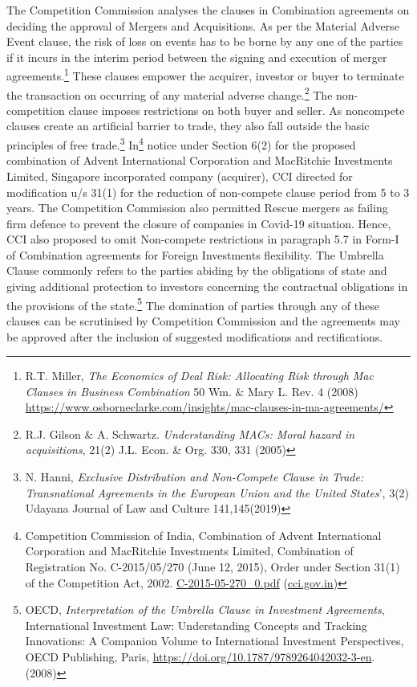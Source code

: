 \begin{multicols}{2}
\noi
The Competition Commission analyses the clauses in Combination agreements on deciding
the approval of Mergers and Acquisitions. As per the Material Adverse Event clause, the risk
of loss on events has to be borne by any one of the parties if it incurs in the interim period
between the signing and execution of merger agreements.\footnote{R.T. Miller, \textit{The Economics of Deal Risk: Allocating Risk through Mac Clauses in Business Combination}
50 Wm. \& Mary L. Rev. 4 (2008) \url{https://www.osborneclarke.com/insights/mac-clauses-in-ma-agreements/}} These clauses empower the
acquirer, investor or buyer to terminate the transaction on occurring of any material adverse
change.\footnote{R.J. Gilson \& A. Schwartz. \textit{Understanding MACs: Moral hazard in acquisitions}, 21(2) J.L. Econ. \& Org.
330, 331 (2005)} The non-competition clause imposes restrictions on both buyer and seller. As noncompete
clauses create an artificial barrier to trade, they also fall outside the basic principles
of free trade.\footnote{N. Hanni, \textit{Exclusive Distribution and Non-Compete Clause in Trade: Transnational Agreements in the
European Union and the United States}’, 3(2) Udayana Journal of Law and Culture 141,145(2019)} In\footnote{Competition Commission of India, Combination of Advent International Corporation and MacRitchie
Investments Limited, Combination of Registration No. C-2015/05/270 (June 12, 2015), Order under Section 31(1) of the Competition Act, 2002. \url{C-2015-05-270_0.pdf} (\url{cci.gov.in})} notice under Section 6(2) for the proposed combination of Advent
International Corporation and MacRitchie Investments Limited, Singapore incorporated
company (acquirer), CCI directed for modification u/s 31(1) for the reduction of non-compete
clause period from 5 to 3 years. The Competition Commission also permitted Rescue mergers
as failing firm defence to prevent the closure of companies in Covid-19 situation. Hence, CCI
also proposed to omit Non-compete restrictions in paragraph 5.7 in Form-I of Combination
agreements for Foreign Investments flexibility. The Umbrella Clause commonly refers to the
parties abiding by the obligations of state and giving additional protection to investors
concerning the contractual obligations in the provisions of the state.\footnote{OECD, \textit{Interpretation of the Umbrella Clause in Investment Agreements}, International Investment Law:
Understanding Concepts and Tracking Innovations: A Companion Volume to International Investment
Perspectives, OECD Publishing, Paris, \url{https://doi.org/10.1787/9789264042032-3-en}.(2008)} The domination of
parties through any of these clauses can be scrutinised by Competition Commission and the
agreements may be approved after the inclusion of suggested modifications and rectifications.


\end{multicols}
